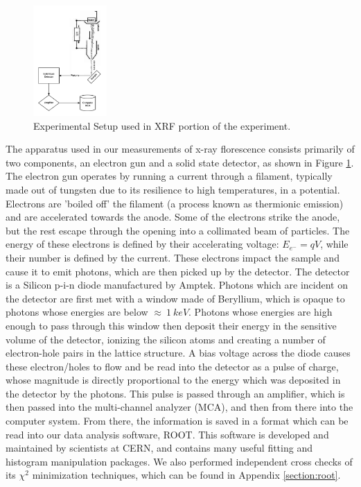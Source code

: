 \documentclass[%
 reprint,
 amsmath,amssymb,
 aps,
 pra,
]{revtex4-1}
\begin{document}
\begin{figure}[H]
	\centering
	\includegraphics[width=0.25\textwidth]{xrf_experiment.png}
	\caption{Experimental Setup used in XRF portion of the experiment.}
	\label{fig:xrf_setup}
\end{figure}

The apparatus used in our measurements of x-ray florescence consists primarily of two components, an electron gun and a solid state detector, as shown in Figure \ref{fig:xrf_setup}. The electron gun operates by running a current through a filament, typically made out of tungsten due to its resilience to high temperatures, in a potential. Electrons are 'boiled off' the filament (a process known as thermionic emission) and are accelerated towards the anode. Some of the electrons strike the anode, but the rest escape through the opening into a collimated beam of particles. The energy of these electrons is defined by their accelerating voltage: $E_{e^-} = qV$, while their number is defined by the current.  These electrons impact the sample and cause it to emit photons, which are then picked up by the detector. The detector is a Silicon p-i-n diode manufactured by Amptek. Photons which are incident on the detector are first met with a window made of Beryllium, which is opaque to photons whose energies are below $\approx ~1~keV$. Photons whose energies are high enough to pass through this window then deposit their energy in the sensitive volume of the detector, ionizing the silicon atoms and creating a number of electron-hole pairs in the lattice structure. A bias voltage across the diode causes these electron/holes to flow and be read into the detector as a pulse of charge, whose magnitude is directly proportional to the energy which was deposited in the detector by the photons. This pulse is passed through an amplifier, which is then passed into the multi-channel analyzer (MCA), and then from there into the computer system. From there, the information is saved in a format which can be read into our data analysis software, ROOT. This software is developed and maintained by scientists at CERN, and contains many useful fitting and histogram manipulation packages. We also performed independent cross checks of its $\chi^2$ minimization techniques, which can be found in Appendix \ref{section:root}.
\end{document}
